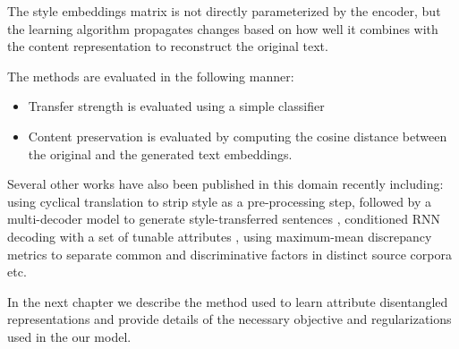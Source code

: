 The style embeddings matrix is not directly parameterized by the encoder, but the learning algorithm propagates changes based on how well it combines with the content representation to reconstruct the original text.

The methods are evaluated in the following manner:
\begin{itemize}
	\item Transfer strength is evaluated using a simple classifier
	\item Content preservation is evaluated by computing the cosine distance between the original and the generated text embeddings.
\end{itemize}


Several other works have also been published in this domain recently including: using cyclical translation to strip style as a pre-processing step, followed by a multi-decoder model to generate style-transferred sentences \citep{prabhumoye2018style}, conditioned RNN decoding with a set of tunable attributes \citep{ficler2017controlling}, using maximum-mean discrepancy metrics to separate common and discriminative factors in distinct source corpora \citep{larsson2017disentangled} etc.


In the next chapter we describe the method used to learn attribute disentangled representations and provide details of the necessary objective and regularizations used in the our model.
